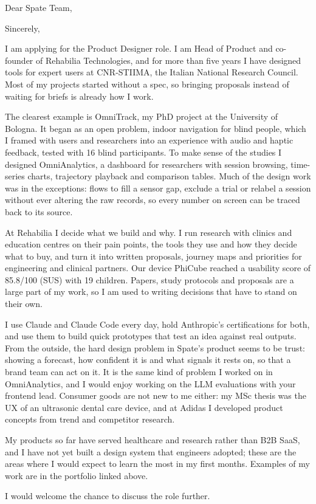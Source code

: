 \documentclass[11pt,a4paper,sans]{moderncv}
\begin{document}

\opening{Dear Spate Team,}
\closing{Sincerely,}
\makelettertitle

I am applying for the Product Designer role. I am Head of Product and co-founder of Rehabilia Technologies, and for more than five years I have designed tools for expert users at CNR-STIIMA, the Italian National Research Council. Most of my projects started without a spec, so bringing proposals instead of waiting for briefs is already how I work.

The clearest example is OmniTrack, my PhD project at the University of Bologna. It began as an open problem, indoor navigation for blind people, which I framed with users and researchers into an experience with audio and haptic feedback, tested with 16 blind participants. To make sense of the studies I designed OmniAnalytics, a dashboard for researchers with session browsing, time-series charts, trajectory playback and comparison tables. Much of the design work was in the exceptions: flows to fill a sensor gap, exclude a trial or relabel a session without ever altering the raw records, so every number on screen can be traced back to its source.

At Rehabilia I decide what we build and why. I run research with clinics and education centres on their pain points, the tools they use and how they decide what to buy, and turn it into written proposals, journey maps and priorities for engineering and clinical partners. Our device PhiCube reached a usability score of 85.8/100 (SUS) with 19 children. Papers, study protocols and proposals are a large part of my work, so I am used to writing decisions that have to stand on their own.

I use Claude and Claude Code every day, hold Anthropic's certifications for both, and use them to build quick prototypes that test an idea against real outputs. From the outside, the hard design problem in Spate's product seems to be trust: showing a forecast, how confident it is and what signals it rests on, so that a brand team can act on it. It is the same kind of problem I worked on in OmniAnalytics, and I would enjoy working on the LLM evaluations with your frontend lead. Consumer goods are not new to me either: my MSc thesis was the UX of an ultrasonic dental care device, and at Adidas I developed product concepts from trend and competitor research.

My products so far have served healthcare and research rather than B2B SaaS, and I have not yet built a design system that engineers adopted; these are the areas where I would expect to learn the most in my first months. Examples of my work are in the portfolio linked above.

I would welcome the chance to discuss the role further.

\makeletterclosing
\end{document}
